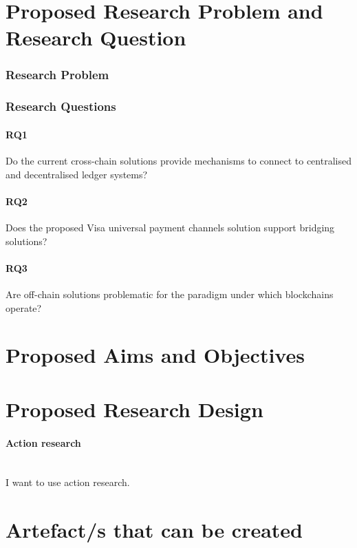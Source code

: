 \documentclass[12pt]{article}
\begin{document}
\section{Proposed Research Problem and Research Question}
\subsubsection{Research Problem}

\subsubsection{Research Questions}
\paragraph{RQ1} Do the current cross-chain solutions provide mechanisms to connect to centralised and decentralised ledger systems?
\paragraph{RQ2} Does the proposed Visa universal payment channels solution support bridging solutions?
\paragraph{RQ3} Are off-chain solutions problematic for the paradigm under which blockchains operate?

\section{Proposed Aims and Objectives}

\section{Proposed Research Design}
\paragraph{Action research}\mbox{} \\
I want to use action research.

\section{Artefact/s that can be created}

\printbibliography
\end{document}
